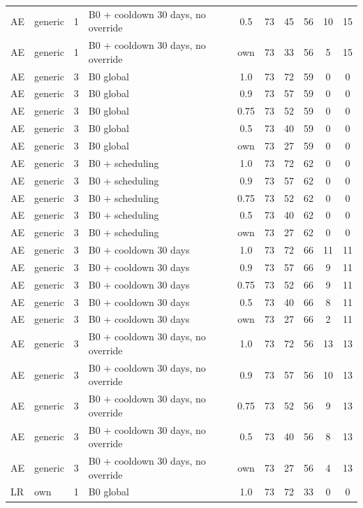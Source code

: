 \begin{longtable}{lllp{4.4cm}cccccc}
AE & generic & 1 & B0 + cooldown 30 days, no override & 0.5 & 73 & 45 & 56 & 10 & 15 \\
AE & generic & 1 & B0 + cooldown 30 days, no override & own & 73 & 33 & 56 & 5 & 15 \\
AE & generic & 3 & B0 global & 1.0 & 73 & 72 & 59 & 0 & 0 \\
AE & generic & 3 & B0 global & 0.9 & 73 & 57 & 59 & 0 & 0 \\
AE & generic & 3 & B0 global & 0.75 & 73 & 52 & 59 & 0 & 0 \\
AE & generic & 3 & B0 global & 0.5 & 73 & 40 & 59 & 0 & 0 \\
AE & generic & 3 & B0 global & own & 73 & 27 & 59 & 0 & 0 \\
AE & generic & 3 & B0 + scheduling & 1.0 & 73 & 72 & 62 & 0 & 0 \\
AE & generic & 3 & B0 + scheduling & 0.9 & 73 & 57 & 62 & 0 & 0 \\
AE & generic & 3 & B0 + scheduling & 0.75 & 73 & 52 & 62 & 0 & 0 \\
AE & generic & 3 & B0 + scheduling & 0.5 & 73 & 40 & 62 & 0 & 0 \\
AE & generic & 3 & B0 + scheduling & own & 73 & 27 & 62 & 0 & 0 \\
AE & generic & 3 & B0 + cooldown 30 days & 1.0 & 73 & 72 & 66 & 11 & 11 \\
AE & generic & 3 & B0 + cooldown 30 days & 0.9 & 73 & 57 & 66 & 9 & 11 \\
AE & generic & 3 & B0 + cooldown 30 days & 0.75 & 73 & 52 & 66 & 9 & 11 \\
AE & generic & 3 & B0 + cooldown 30 days & 0.5 & 73 & 40 & 66 & 8 & 11 \\
AE & generic & 3 & B0 + cooldown 30 days & own & 73 & 27 & 66 & 2 & 11 \\
AE & generic & 3 & B0 + cooldown 30 days, no override & 1.0 & 73 & 72 & 56 & 13 & 13 \\
AE & generic & 3 & B0 + cooldown 30 days, no override & 0.9 & 73 & 57 & 56 & 10 & 13 \\
AE & generic & 3 & B0 + cooldown 30 days, no override & 0.75 & 73 & 52 & 56 & 9 & 13 \\
AE & generic & 3 & B0 + cooldown 30 days, no override & 0.5 & 73 & 40 & 56 & 8 & 13 \\
AE & generic & 3 & B0 + cooldown 30 days, no override & own & 73 & 27 & 56 & 4 & 13 \\
LR & own & 1 & B0 global & 1.0 & 73 & 72 & 33 & 0 & 0 \\

\end{longtable}
